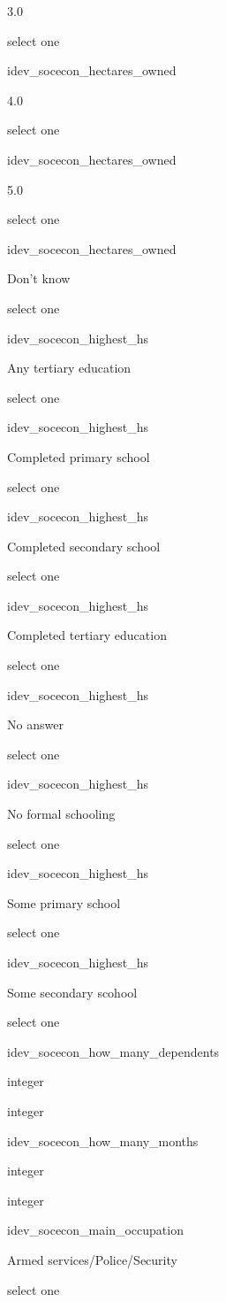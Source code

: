 \documentclass[]{article}
\begin{document}
3.0

select one

idev\_socecon\_hectares\_owned

4.0

select one

idev\_socecon\_hectares\_owned

5.0

select one

idev\_socecon\_hectares\_owned

Don't know

select one

idev\_socecon\_highest\_hs

Any tertiary education

select one

idev\_socecon\_highest\_hs

Completed primary school

select one

idev\_socecon\_highest\_hs

Completed secondary school

select one

idev\_socecon\_highest\_hs

Completed tertiary education

select one

idev\_socecon\_highest\_hs

No answer

select one

idev\_socecon\_highest\_hs

No formal schooling

select one

idev\_socecon\_highest\_hs

Some primary school

select one

idev\_socecon\_highest\_hs

Some secondary scohool

select one

idev\_socecon\_how\_many\_dependents

integer

integer

idev\_socecon\_how\_many\_months

integer

integer

idev\_socecon\_main\_occupation

Armed services/Police/Security

select one
\end{document}
